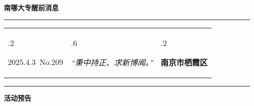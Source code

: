 \documentclass[letterpaper, 12pt]{article}
\begin{document}
\begin{center}
    \Huge\textbf{南哪大专醒前消息}
\end{center}
\vspace{4mm}
\hrule
\renewcommand\tabularxcolumn[1]{m{#1}}
\begin{tabularx}{\textwidth}{>{\hsize.2\hsize}X>{\hsize.6\hsize}X>{\hsize.2\hsize}X}
    \begin{flushleft}
        2025.4.3\, No.209
    \end{flushleft}
    &
    \begin{center}
        \textit{“秉中持正、求新博闻。”}
    \end{center}
    &
    \begin{flushright}
        \textbf{南京市栖霞区}
    \end{flushright}
\end{tabularx}
\vspace{-3.5mm}
\hrule
\vspace{4mm}
\centerline{\huge\textbf{活动预告}}
\end{document}
